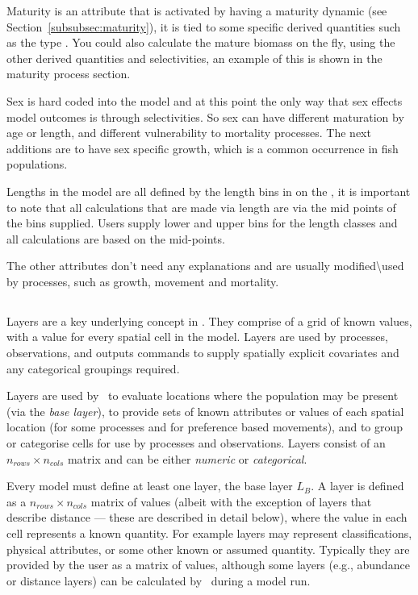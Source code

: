 Maturity is an attribute that is activated by having a maturity dynamic (see Section~\ref{subsubsec:maturity}), it is tied to some specific derived quantities such as the type . You could also calculate the mature biomass on the fly, using the other derived quantities and selectivities, an example of this is shown in the maturity process section.

Sex is hard coded into the model and at this point the only way that sex effects model outcomes is through selectivities. So sex can have different maturation by age or length, and different vulnerability to mortality processes. The next additions are to have sex specific growth, which is a common occurrence in fish populations.

Lengths in the model are all defined by the length bins in on the , it is important to note that all calculations that are made via length are via the mid points of the bins supplied. Users supply lower and upper bins for the length classes and all calculations are based on the mid-points.

The other attributes don't need any explanations and are usually modified\textbackslash used by processes, such as growth, movement and mortality.

\subsection{\label{sec:layers}}
Layers are a key underlying concept in \IBM. They comprise of a grid of known values, with a value for every spatial cell in the model. Layers are used by processes, observations, and outputs commands to supply spatially explicit covariates and any categorical groupings required. 

Layers are used by \IBM\ to evaluate locations where the population may be present (via the \emph{base layer}), to provide sets of known attributes or values of each spatial location (for some processes and for preference based movements), and to group or categorise cells for use by processes and observations. Layers consist of an $n_{rows} \times n_{cols}$ matrix and can be either \emph{numeric} or \emph{categorical}. 

Every model must define at least one layer, the base layer $L_B$. A layer is defined as a $n_{rows} \times n_{cols}$ matrix of values (albeit with the exception of layers that describe distance --- these are described in detail below), where the value in each cell represents a known quantity. For example layers may represent classifications, physical attributes, or some other known or assumed quantity. Typically they are provided by the user as a matrix of values, although some layers (e.g., abundance or distance layers) can be calculated by \IBM\ during a model run. 

